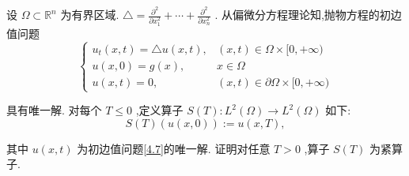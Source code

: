 \documentclass[lang=cn,newtx,10pt,scheme=chinese,thmcnt=chapter]{elegantbook}
\begin{document}
\begin{example}
    设 \(\Omega  \subset  {\mathbb{R}}^{n}\) 为有界区域. \(\bigtriangleup  = \frac{{\partial }^{2}}{\partial {x}_{1}^{2}} + \cdots  + \frac{{\partial }^{2}}{\partial {x}_{n}^{2}}\) . 从偏微分方程理论知,抛物方程的初边值问题
\begin{equation}
\left\{  \begin{array}{ll} {u}_{t}\left( {x,t}\right)  = \bigtriangleup u\left( {x,t}\right) , & \left( {x,t}\right)  \in  \Omega  \times  \lbrack 0, + \infty ) \\  u\left( {x,0}\right)  = g\left( x\right) , & x \in  \Omega \\  u\left( {x,t}\right)  = 0, & \left( {x,t}\right)  \in  \partial \Omega  \times  \lbrack 0, + \infty ) \end{array}\right.  \label{4.7}
\end{equation}

具有唯一解. 对每个 \(T \leqslant  0\) ,定义算子 \(S\left( T\right)  : {L}^{2}\left( \Omega \right)  \rightarrow  {L}^{2}\left( \Omega \right)\) 如下:
\begin{equation}
S\left( T\right) \left( {u\left( {x,0}\right) }\right)  \mathrel{\text{ := }} u\left( {x,T}\right) , \label{4.8}
\end{equation}

其中 \(u\left( {x,t}\right)\) 为初边值问题\ref{4.7}的唯一解. 证明对任意 \(T > 0\) ,算子 \(S\left( T\right)\) 为紧算子.
\end{example}
\end{document}
